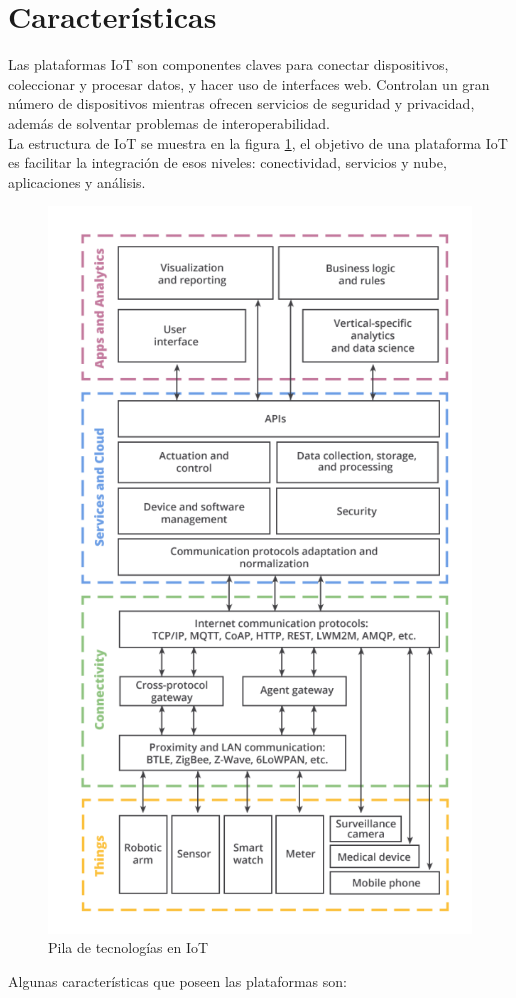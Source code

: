\documentclass[12pt, twoside]{book}
\begin{document}
\section{Características}
Las plataformas IoT son componentes claves para conectar dispositivos, coleccionar y procesar datos, y hacer uso de interfaces web. Controlan un gran número de dispositivos mientras ofrecen servicios de seguridad y privacidad, además de solventar problemas de interoperabilidad.\\ 
La estructura de IoT se muestra en la figura \ref{stack_iot}, el objetivo de una plataforma IoT es facilitar la integración de esos niveles: conectividad, servicios y nube, aplicaciones y análisis.
\begin{figure}[H]
\centering
\includegraphics[scale=0.37]{images/iot_stack}
\caption{Pila de tecnologías en IoT}\label{stack_iot}
\end{figure}
Algunas características que poseen las plataformas son:
\end{document}
